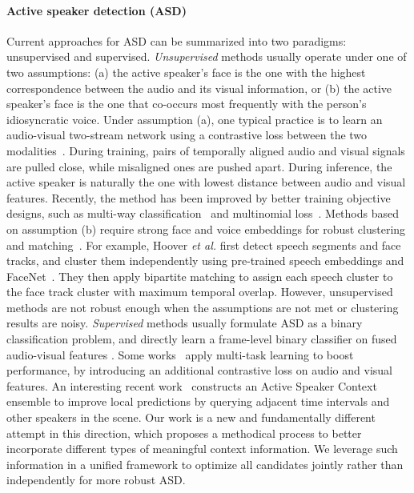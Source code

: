 \documentclass[sigconf]{acmart}
\begin{document}
\begin{CCSXML}
\paragraph{Active speaker detection (ASD)} Current approaches for ASD can be summarized into two paradigms: unsupervised and supervised. \textit{Unsupervised} methods usually operate under one of two assumptions: (a) the active speaker's face is the one with the highest correspondence between the audio and its visual information, or (b) the active speaker's face is the one that co-occurs most frequently with the person's idiosyncratic voice. Under assumption (a), one typical practice is to learn an audio-visual two-stream network using a contrastive loss between the two modalities~\cite{DBLP:conf/accv/ChungZ16a}. During training, pairs of temporally aligned audio and visual signals are pulled close, while misaligned ones are pushed apart. During inference, the active speaker is naturally the one with lowest distance between audio and visual features. Recently, the method has been improved by better training objective designs, such as multi-way classification~\cite{DBLP:conf/icassp/ChungCK19} and multinomial loss~\cite{DBLP:conf/icassp/DingXZCW20}. Methods based on assumption (b) require strong face and voice embeddings for robust clustering and matching~\cite{DBLP:conf/mm/BredinG16,DBLP:conf/icassp/HooverCPSS18}. For example, Hoover \textit{et al.} \cite{DBLP:conf/icassp/HooverCPSS18} first detect speech segments and face tracks, and cluster them independently using pre-trained speech embeddings and  FaceNet~\cite{DBLP:conf/cvpr/SchroffKP15}. They then apply bipartite matching to assign each speech cluster to the face track cluster with maximum temporal overlap. However, unsupervised methods are not robust enough when the assumptions are not met or clustering results are noisy. \textit{Supervised} methods usually formulate ASD as a binary classification problem, and directly learn a frame-level binary classifier on fused audio-visual features \cite{DBLP:conf/icassp/RothCKMGKRSSXP20,DBLP:journals/corr/abs-1906-10555}. Some works~\cite{zhangmulti2019,DBLP:conf/cvpr/HuangK20} apply multi-task learning to boost performance, by introducing an additional contrastive loss on audio and visual features. An interesting recent work~\cite{DBLP:conf/cvpr/AlcazarCMPLAG20} constructs an Active Speaker Context ensemble to improve local predictions by querying adjacent time intervals and other speakers in the scene. Our work is a new and fundamentally different attempt in this direction, which proposes a methodical process to better incorporate different types of meaningful context information. We leverage such information in a unified framework to optimize all candidates jointly rather than independently for more robust ASD.
\vspace{-1ex}

\end{CCSXML}
\end{document}
